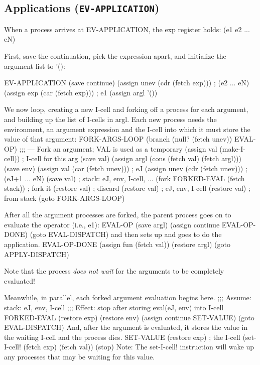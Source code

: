\subsection{Applications ({\tt EV-APPLICATION})}

When a process arrives at {\cf EV-APPLICATION}, the {\cf exp} register holds:
\beginlisp
(e1 e2 ... eN)
\endlisp

First, save the continuation, pick the expression apart, and
initialize the argument list to {\cf '()}:

\beginlisp
EV-APPLICATION
  (save continue)
  (assign unev (cdr (fetch exp)))    ; (e2 ... eN)
  (assign exp  (car (fetch exp)))    ; e1
  (assign argl '())
\endlisp

We now loop, creating a new I-cell and forking off a process for each
argument, and building up the list of I-cells in {\cf argl}.  Each new
process needs the environment, an argument expression and the I-cell
into which it must store the value of that argument:
\beginlisp
FORK-ARGS-LOOP
  (branch (null? (fetch unev)) EVAL-OP)
\null
;;; --- Fork an argument; VAL is used as a temporary
  (assign val  (make-I-cell))          ; I-cell for this arg
  (save val)
  (assign argl (cons (fetch val) (fetch argl)))
  (save env)
  (assign val (car (fetch unev)))      ; eJ
  (assign unev (cdr (fetch unev)))     ; (eJ+1 ... eN)
  (save val)                           ; stack: eJ, env, I-cell, ...
  (fork FORKED-EVAL (fetch stack))     ; fork it
\null
  (restore val)                        ; discard
  (restore val)                        ;    eJ, env, I-cell
  (restore val)                        ; from stack
  (goto FORK-ARGS-LOOP)
\endlisp

After all the argument processes are forked, the parent process goes on to evaluate
the operator (i.e., {\cf e1}):
\beginlisp
EVAL-OP
  (save argl)
\null
  (assign continue EVAL-OP-DONE)
  (goto EVAL-DISPATCH)
\endlisp
and then sets up and goes to do the application.
\beginlisp
EVAL-OP-DONE
  (assign fun (fetch val))
  (restore argl)
  (goto APPLY-DISPATCH)
\endlisp

Note that the process {\em does not wait\/} for the arguments to be
completely evaluated!

Meanwhile, in parallel, each forked argument evaluation begins here.
\beginlisp
;;; Assume: stack: eJ, env, I-cell
;;; Effect: stop after storing eval(eJ, env) into I-cell
\null
FORKED-EVAL
  (restore exp)
  (restore env)
  (assign continue SET-VALUE)
  (goto EVAL-DISPATCH)
\endlisp
And, after the argument is evaluated, it stores the value in the waiting I-cell and
the process dies.
\beginlisp
SET-VALUE
  (restore exp)                           ; the I-cell
  (set-I-cell! (fetch exp) (fetch val))
  (stop)
\endlisp
 Note:  The {\cf set-I-cell!} instruction will wake up any processes that may
be waiting for this value.

